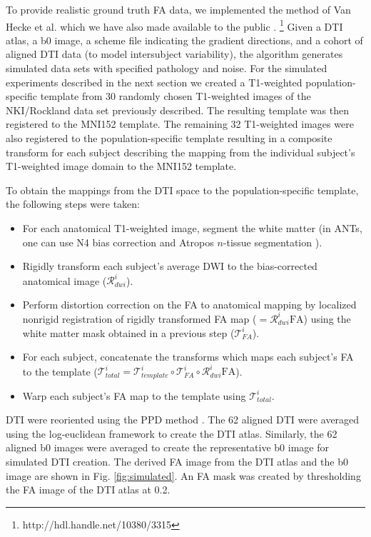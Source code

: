 \documentclass[final,5p,times,twocolumn]{elsarticle}
\begin{document}
To provide realistic ground truth FA data, we implemented 
the method of Van Hecke et al. \cite{van-hecke2009} which 
we have also made available to the public
\cite{Tustison2011}.%
\footnote{
http://hdl.handle.net/10380/3315
}  
Given a DTI atlas, a b0 image, a scheme file indicating
the gradient directions, and 
a cohort of aligned DTI data (to model intersubject variability), the
algorithm generates
simulated data sets with specified pathology and noise.
For the simulated experiments described in the next section we
created a T1-weighted population-specific template from 30 randomly chosen T1-weighted images of
the NKI/Rockland data set previously described.  
The resulting
template was then registered to the MNI152 template.  
The remaining 32 T1-weighted images were also registered to the population-specific 
template resulting in a composite transform for each subject describing
the mapping from the individual subject's T1-weighted image domain to 
the MNI152 template.  

To obtain the mappings from the DTI space to the population-specific
template, the following steps were taken:
\begin{itemize}
  \item For each anatomical T1-weighted image, segment the white matter (in ANTs, one can use N4 bias correction \citep{Tustison2010} and Atropos $n$-tissue segmentation \citep{Avants2011a}).
  \item Rigidly transform each subject's average DWI to the bias-corrected anatomical image ($\mathcal{R}^i_{dwi}$).
  \item Perform distortion correction on the FA to anatomical mapping 
        by localized nonrigid registration
        of rigidly transformed FA map ($=\mathcal{R}^i_{dwi} \mathrm{FA}$) using
        the white matter mask obtained in a previous step ($\mathcal{T}^i_{FA}$).
  \item For each subject, concatenate the transforms which maps each
        subject's FA to the template ($\mathcal{T}^i_{total} = \mathcal{T}^i_{template} \circ 
        \mathcal{T}^i_{FA} \circ \mathcal{R}^i_{dwi} \mathrm{FA}$).
  \item Warp each subject's FA map to the template using $\mathcal{T}^i_{total}$.  
\end{itemize}
DTI 
were reoriented using the PPD method \cite{alexander2001}.  The 62
aligned DTI were averaged using the log-euclidean framework 
\cite{arsigny2006} to create the DTI atlas.  Similarly, the 62 aligned
b0 images were averaged to create the representative b0 image
for simulated DTI creation.  The derived FA image from the DTI atlas and 
the b0 image are shown in 
Fig. \ref{fig:simulated}.  An FA mask was created by thresholding 
the FA image of the DTI atlas at 0.2.
\end{document}
